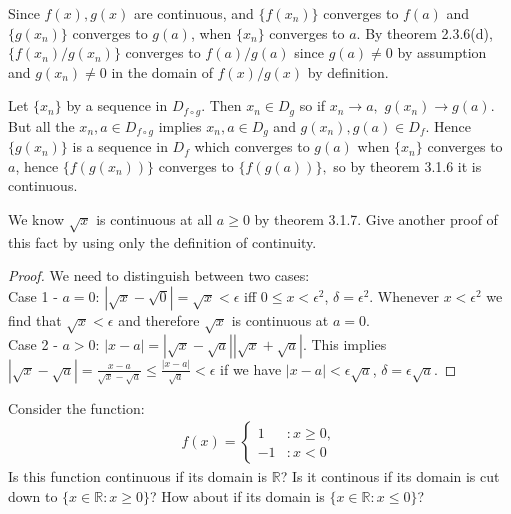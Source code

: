 \documentclass[12pt]{book}
\newcommand{\R}{\mathbb{R}}
\newenvironment{exercise}[2][Exercise]{\begin{trivlist}
\item[\hskip \labelsep {\bfseries #1}\hskip \labelsep {\bfseries #2.}]}{\end{trivlist}}
\begin{document}
\begin{exercise}{3.1.6}
Since $f(x), g(x)$ are continuous, and $\{f(x_n)\}$ converges to $f(a)$ and $\{g(x_n)\}$ converges to $g(a)$, when $\{x_n\}$ converges to $a$. By theorem 2.3.6(d), $\{f(x_n)/g(x_n)\}$ converges to $f(a)/g(a)$ since $g(a) \neq 0$ by assumption and $g(x_n) \neq 0$ in the domain of $f(x)/g(x)$ by definition.
\end{exercise}

\begin{exercise}{3.1.7} Let $\{x_n\}$ by a sequence in $D_{f \circ g}$. Then $x_n \in D_g$ so if $x_n \rightarrow a,$ $g(x_n) \rightarrow g(a)$. But all the $x_n, a \in D_{f \circ g}$ implies $x_n, a \in D_g$ and $g(x_n), g(a) \in D_f.$ Hence $\{g(x_n)\}$ is a sequence in $D_f$ which converges to $g(a)$ when $\{x_n\}$ converges to $a$, hence $\{f(g(x_n))\}$ converges to $\{f(g(a))\},$ so by theorem 3.1.6 it is continuous.
\end{exercise}

\begin{exercise}{3.1.8}
    We know $\sqrt{x}$ is continuous at all $a \geq 0$ by theorem 3.1.7. Give another proof of this fact by using only the definition of continuity.

    \begin{proof}
    We need to distinguish between two cases: \\
    Case 1 - $a= 0$: $|\sqrt{x} - \sqrt{0}| = \sqrt{x} < \epsilon$ iff $0 \leq x < \epsilon^2$, $\delta=\epsilon^2$. Whenever $x<\epsilon^2$ we find that $\sqrt{x}< \epsilon$ and therefore $\sqrt{x}$ is continuous at $a=0$. \\
    Case 2 - $a>0$: $|x-a|=|\sqrt{x}-\sqrt{a}| |\sqrt{x}+\sqrt{a}|$. This implies $|\sqrt{x}-\sqrt{a}| = \frac{x-a}{\sqrt{x}-\sqrt{a}} \leq \frac{|x-a|}{\sqrt{a}} < \epsilon$ if we have $|x-a| < \epsilon \sqrt{a}$, $\delta=\epsilon \sqrt{a}$.
    \end{proof}
\end{exercise}

\begin{exercise}{3.1.9}
Consider the function:
	\begin{align*}
	f(x) = \left\{
     \begin{array}{lr}
       1 & : x \geq 0,\\
       -1 & : x < 0
     \end{array}
   \right.
	\end{align*}
Is this function continuous if its domain is $\R$? Is it continous if its domain is cut down to $\{ x\in \R: x \geq 0 \}$? How about if its domain is $\{x \in \R : x \leq 0 \}$?
\end{exercise}
\end{document}

